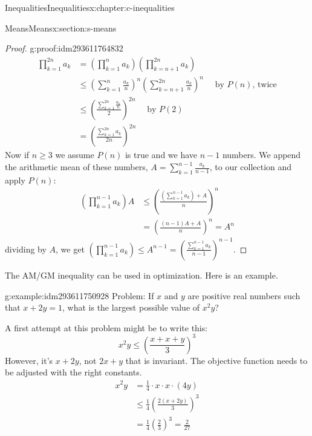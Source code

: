 \documentclass[twoside,10pt,]{book}
\numberwithin{equation}{section}
\begin{document}
\begin{chapterptx}{Inequalities}{}{Inequalities}{}{}{x:chapter:c-inequalities}
\begin{sectionptx}{Means}{}{Means}{}{}{x:section:s-means}
\begin{proof}{}{g:proof:idm293611764832}
\begin{equation*}
\begin{split}
\prod_{k=1}^{2n} a_k &=\left(\prod_{k=1}^{n} a_k \right)\left(\prod_{k=n+1}^{2n} a_k  \right) \\	
& \leq \left(\sum_{k=1}^{n} \frac{a_k}{n} \right)^n \left(\sum_{k=n+1}^{2n} \frac{a_k}{n} \right)^n \quad \textrm{ by }P(n)\textrm{, twice}\\
& \leq \left(\frac{\sum_{k=1}^{2n} \frac{a_k}{n}}{2}\right)^{2n} \quad \textrm{ by }P(2)\\
& = \left(\frac{\sum_{k=1}^{2n} a_k}{2n}\right)^{2n} 
\end{split}
\end{equation*}
Now if \(n \ge 3\) we assume \(P(n)\) is true and we have \(n-1\) numbers. We append the arithmetic mean of these numbers, \(A = \sum_{k=1}^{n-1} \frac{a_k}{n-1}\), to our collection and apply \(P(n)\):%
\begin{equation*}
\begin{split}
\left(\prod_{k=1}^{n-1} a_k\right)A & \leq \left(\frac{\left(\sum_{k=1}^{n-1} a_k\right) + A}{n}\right)^n\\
& = \left( \frac{(n-1)A + A}{n} \right)^n = A^n
\end{split}
\end{equation*}
dividing by \(A\), we get \(\left(\prod_{k=1}^{n-1} a_k\right) \leq A^{n-1} = \left(\frac{\sum_{k=1}^{n-1} a_{k}}{n-1}\right)^{n-1}\).%
\end{proof}
The AM\slash{}GM inequality can be used in optimization.  Here is an example.%
\begin{example}{}{g:example:idm293611750928}%
Problem:  If \(x\) and \(y\) are positive real numbers such that \(x+2y=1\), what is the largest possible value of \(x^2 y\)?%
\par
A first attempt at this problem might be to write this:%
\begin{equation*}
x^2 y \leq  \left( \frac{x + x + y}{3} \right)^3
\end{equation*}
However, it's \(x+2y\), not \(2x + y\) that is invariant. The objective function needs to be adjusted with the right constants.%
\begin{equation*}
\begin{split}
x^2 y &= \frac{1}{4} \cdot x\cdot x\cdot (4 y) \\
&\leq  \frac{1}{4} \left( \frac{2(x+2y)}{3} \right)^3\\
& = \frac{1}{4} \left( \frac{2}{3} \right)^3 = \frac{2}{27} 
\end{split}
\end{equation*}

\end{example}
\end{sectionptx}
\end{chapterptx}
\end{document}
